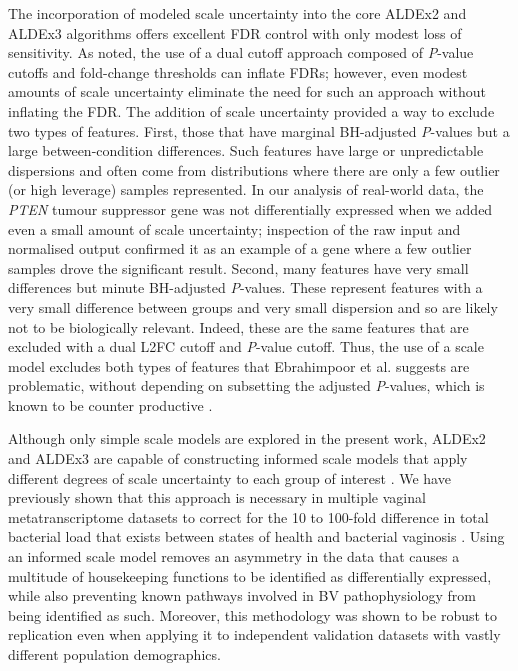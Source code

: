 \documentclass{article}
\begin{document}
The incorporation of modeled scale uncertainty into the core ALDEx2 and ALDEx3 algorithms offers excellent FDR control with only modest loss of sensitivity. As noted,  the use of a dual cutoff approach composed of \textit{P}-value cutoffs and fold-change thresholds can inflate FDRs; however, even modest amounts of scale uncertainty eliminate the need for such an approach without inflating the FDR. The addition of scale uncertainty provided a way to exclude two types of features. First, those that have marginal BH-adjusted \textit{P}-values but a large between-condition differences. Such features have large or unpredictable dispersions and often come from  distributions where there are only a few outlier (or high leverage) samples represented.  In our analysis of real-world data, the \textit{PTEN} tumour suppressor gene was not differentially expressed when we added even a small amount of scale uncertainty; inspection of the raw input and normalised output confirmed it as an  example of a gene where a few outlier samples drove the significant result. Second, many features have very small differences but minute BH-adjusted \textit{P}-values. These represent features with a very small difference between groups and very small dispersion and so are likely not to be biologically relevant. Indeed, these are the same features that are excluded with a dual L2FC cutoff and \textit{P}-value cutoff. Thus, the use of a scale model excludes both types of features that Ebrahimpoor et al. \cite{ebrahimpoor_inflated_2021} suggests are problematic, without depending on subsetting the adjusted \textit{P}-values, which is known to be counter productive \cite{Goeman:2014aa, ebrahimpoor_inflated_2021}.

Although only simple scale models are explored in the present work, ALDEx2 and ALDEx3 are capable of constructing informed scale models that apply different degrees of scale uncertainty to each group of interest \cite{nixon_scale_2024, nixon_incorporating_2025}. We have previously shown that this approach is necessary in multiple vaginal metatranscriptome datasets to correct for the 10 to 100-fold difference in total bacterial load that exists between states of health and bacterial vaginosis \cite{dos_santos_vaginal_2024, zozaya-hinchliffe_quantitative_2010}. Using an informed scale model removes an asymmetry in the data that causes a multitude of housekeeping functions to be identified as differentially expressed, while also preventing known pathways involved in BV pathophysiology from being identified as such. Moreover, this methodology was shown to be robust to replication even when applying it to independent validation datasets with vastly different population demographics.
\end{document}
